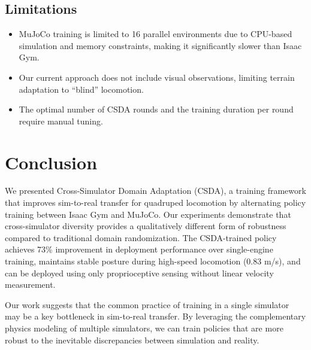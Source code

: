 \documentclass[conference]{IEEEtran}
\begin{document}
\subsection{Limitations}

\begin{itemize}
    \item MuJoCo training is limited to 16 parallel environments due to CPU-based simulation and memory constraints, making it significantly slower than Isaac Gym.
    \item Our current approach does not include visual observations, limiting terrain adaptation to ``blind'' locomotion.
    \item The optimal number of CSDA rounds and the training duration per round require manual tuning.
\end{itemize}

\section{Conclusion}

We presented Cross-Simulator Domain Adaptation (CSDA), a training framework that improves sim-to-real transfer for quadruped locomotion by alternating policy training between Isaac Gym and MuJoCo. Our experiments demonstrate that cross-simulator diversity provides a qualitatively different form of robustness compared to traditional domain randomization. The CSDA-trained policy achieves 73\% improvement in deployment performance over single-engine training, maintains stable posture during high-speed locomotion (0.83 m/s), and can be deployed using only proprioceptive sensing without linear velocity measurement.

Our work suggests that the common practice of training in a single simulator may be a key bottleneck in sim-to-real transfer. By leveraging the complementary physics modeling of multiple simulators, we can train policies that are more robust to the inevitable discrepancies between simulation and reality.
\end{document}
